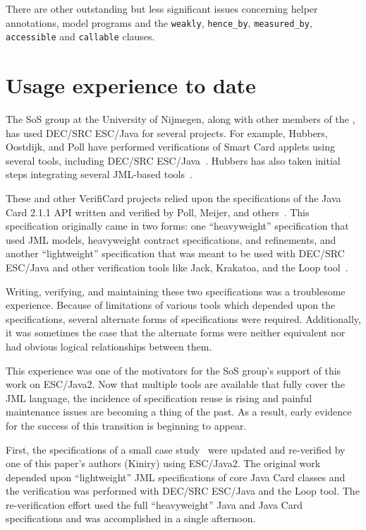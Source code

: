 \documentclass{llncs}
\begin{document}
There are other outstanding but less significant issues concerning
helper annotations, model programs and the \texttt{weakly},
\texttt{hence\_by}, \texttt{measured\_by}, \texttt{accessible} and
\texttt{callable} clauses.

\section{Usage experience to date}
\label{sec:usage-exper-date}
The SoS group at the University of Nijmegen, along with other members
of the , has used DEC/SRC ESC/Java for
several projects.  For example, Hubbers, Oostdijk, and Poll have
performed verifications of Smart Card applets using several tools,
including DEC/SRC ESC/Java~\cite{HOP04}.  Hubbers has also taken
initial steps integrating several JML-based tools~\cite{Hub03}.

These and other VerifiCard projects relied upon the specifications of
the Java Card 2.1.1 API written and verified by Poll, Meijer, and
others~\cite{MeijerPoll01}.  This specification originally came in two
forms: one ``heavyweight'' specification that used JML models,
heavyweight contract specifications, and refinements, and another
``lightweight'' specification that was meant to be used with DEC/SRC
ESC/Java and other verification tools like Jack, Krakatoa, and the
Loop tool~\cite{BergJ01,BurdyRequet02,MarchePaulinMohringUrbain04}.

Writing, verifying, and maintaining these two specifications was a
troublesome experience.  Because of limitations of various tools which
depended upon the specifications, several alternate forms of
specifications were required.  Additionally, it was sometimes the case
that the alternate forms were neither equivalent nor had obvious
logical relationships between them.

This experience was one of the motivators for the SoS group's support
of this work on ESC/Java2.  Now that multiple tools are available that
fully cover the JML language, the incidence of specification reuse is
rising and painful maintenance issues are becoming a thing of the
past.  As a result, early evidence for the success of this transition
is beginning to appear.

First, the specifications of a small case
study~\cite{BreunesseJacobsBerg02} were updated and re-verified by one
of this paper's authors (Kiniry) using ESC/Java2.  The original work
depended upon ``light\-weight'' JML specifications of core Java Card
classes and the verification was performed with DEC/SRC ESC/Java and
the Loop tool.  The re-verification effort used the full
``heavyweight'' Java and Java Card specifications and was accomplished
in a single afternoon.
\end{document}
